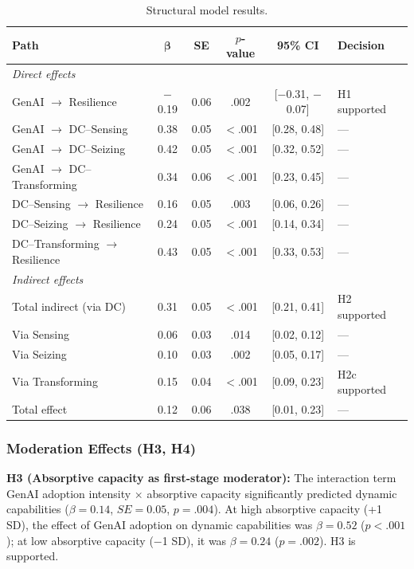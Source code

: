 \documentclass[12pt, a4paper]{article}
\begin{document}
\begin{table}[H]
\centering
\caption{Structural model results.}
\label{tab:results}
\small
\begin{tabular}{lccccl}
\toprule
\textbf{Path} & $\boldsymbol{\beta}$ & \textbf{SE} & \textbf{$p$-value} & \textbf{95\% CI} & \textbf{Decision} \\
\midrule
\multicolumn{6}{l}{\textit{Direct effects}} \\
GenAI $\rightarrow$ Resilience & $-$0.19 & 0.06 & .002 & [$-$0.31, $-$0.07] & H1 supported \\
GenAI $\rightarrow$ DC--Sensing & 0.38 & 0.05 & $<$.001 & [0.28, 0.48] & --- \\
GenAI $\rightarrow$ DC--Seizing & 0.42 & 0.05 & $<$.001 & [0.32, 0.52] & --- \\
GenAI $\rightarrow$ DC--Transforming & 0.34 & 0.06 & $<$.001 & [0.23, 0.45] & --- \\
DC--Sensing $\rightarrow$ Resilience & 0.16 & 0.05 & .003 & [0.06, 0.26] & --- \\
DC--Seizing $\rightarrow$ Resilience & 0.24 & 0.05 & $<$.001 & [0.14, 0.34] & --- \\
DC--Transforming $\rightarrow$ Resilience & 0.43 & 0.05 & $<$.001 & [0.33, 0.53] & --- \\
\midrule
\multicolumn{6}{l}{\textit{Indirect effects}} \\
Total indirect (via DC) & 0.31 & 0.05 & $<$.001 & [0.21, 0.41] & H2 supported \\
Via Sensing & 0.06 & 0.03 & .014 & [0.02, 0.12] & --- \\
Via Seizing & 0.10 & 0.03 & .002 & [0.05, 0.17] & --- \\
Via Transforming & 0.15 & 0.04 & $<$.001 & [0.09, 0.23] & H2c supported \\
\midrule
Total effect & 0.12 & 0.06 & .038 & [0.01, 0.23] & --- \\
\bottomrule
\end{tabular}
\end{table}

\subsubsection{Moderation Effects (H3, H4)}

\textbf{H3 (Absorptive capacity as first-stage moderator):} The interaction term GenAI adoption intensity $\times$ absorptive capacity significantly predicted dynamic capabilities ($\beta = 0.14$, $SE = 0.05$, $p = .004$). At high absorptive capacity (+1 SD), the effect of GenAI adoption on dynamic capabilities was $\beta = 0.52$ ($p < .001$); at low absorptive capacity ($-$1 SD), it was $\beta = 0.24$ ($p = .002$). H3 is supported.
\end{document}
